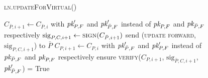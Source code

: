 \begin{figure}[H]
  \begin{processbox}{\textsc{ln}.\textsc{updateForVirtual}()}
    \begin{algorithmic}[1]
      \State $C_{\bar{P}, i+1} \gets C_{\bar{P}, i}$ with $\textit{pk}_{P, F}'$ and
      $\textit{pk}_{\bar{P}, F}'$ instead of $\textit{pk}_{P, F}$ and $\textit{pk}_{\bar{P}, F}$
      respectively
      \State $\mathrm{sig}_{P, C, i+1} \gets \textsc{sign}(C_{\bar{P}, i+1})$
      \State send (\textsc{update forward}, $\mathrm{sig}_{P, C, i+1}$) to
      $\bar{P}$ \State {}
      \State {}
      \State {}
      \State {}
      \State {} 
      \State {}
      \State $C_{P, i+1} \gets C_{P, i}$ with $\textit{pk}_{\bar{P}, F}'$ and $\textit{pk}_{P,
      F}'$ instead of $\textit{pk}_{\bar{P}, F}$ and $\textit{pk}_{P, F}$ respectively
      \State ensure \textsc{verify}($C_{P, i+1}$, $\mathrm{sig}_{\bar{P}, C,
      i+1}$, $\textit{pk}_{\bar{P}, F}'$) = True
    \end{algorithmic}
  \end{processbox}
  \caption{}
  \label{code:ln:open:virtual-update}
\end{figure}

